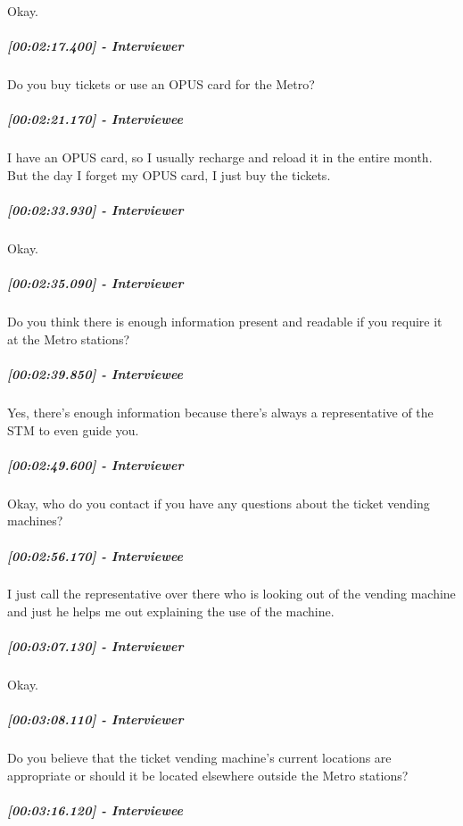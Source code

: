 \documentclass[a4paper,12pt]{article}
\begin{document}
Okay.

\hypertarget{interviewer-15}{%
\subparagraph{{[}00:02:17.400{]} - Interviewer}\label{interviewer-15}}

Do you buy tickets or use an OPUS card for the Metro?

\hypertarget{interviewee-11}{%
\subparagraph{{[}00:02:21.170{]} - Interviewee}\label{interviewee-11}}

I have an OPUS card, so I usually recharge and reload it in the entire
month. But the day I forget my OPUS card, I just buy the tickets.

\hypertarget{interviewer-16}{%
\subparagraph{{[}00:02:33.930{]} - Interviewer}\label{interviewer-16}}

Okay.

\hypertarget{interviewer-17}{%
\subparagraph{{[}00:02:35.090{]} - Interviewer}\label{interviewer-17}}

Do you think there is enough information present and readable if you
require it at the Metro stations?

\hypertarget{interviewee-12}{%
\subparagraph{{[}00:02:39.850{]} - Interviewee}\label{interviewee-12}}

Yes, there's enough information because there's always a representative
of the STM to even guide you.

\hypertarget{interviewer-18}{%
\subparagraph{{[}00:02:49.600{]} - Interviewer}\label{interviewer-18}}

Okay, who do you contact if you have any questions about the ticket
vending machines?

\hypertarget{interviewee-13}{%
\subparagraph{{[}00:02:56.170{]} - Interviewee}\label{interviewee-13}}

I just call the representative over there who is looking out of the
vending machine and just he helps me out explaining the use of the
machine.

\hypertarget{interviewer-19}{%
\subparagraph{{[}00:03:07.130{]} - Interviewer}\label{interviewer-19}}

Okay.

\hypertarget{interviewer-20}{%
\subparagraph{{[}00:03:08.110{]} - Interviewer}\label{interviewer-20}}

Do you believe that the ticket vending machine's current locations are
appropriate or should it be located elsewhere outside the Metro
stations?

\hypertarget{interviewee-14}{%
\subparagraph{{[}00:03:16.120{]} - Interviewee}\label{interviewee-14}}
\end{document}

